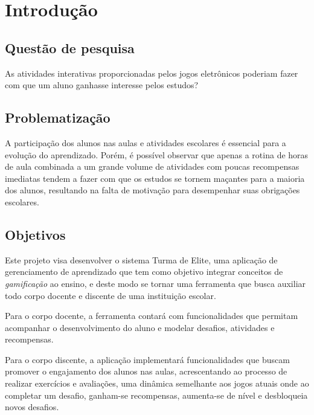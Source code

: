 \documentclass[
    12pt,               %
    openright,          %
    oneside,
    a4paper,            %
    paginasA3,  %
    MODELO,             %
    TODO,               %
    english,            %
    brazil              %
    ]{ifsp-spo-inf-ctds} %
\begin{document}
\tableofcontents*


\textual

\chapter[Introdução]{Introdução}
\section{Questão de pesquisa}
As atividades interativas proporcionadas pelos jogos eletrônicos poderiam fazer com que um aluno ganhasse interesse pelos estudos?

\section{Problematização}
A participação dos alunos nas aulas e atividades escolares é essencial para a evolução do aprendizado. Porém, é possível observar que apenas a rotina de horas de aula combinada a um grande volume de atividades com poucas recompensas imediatas tendem a fazer com que os estudos se tornem maçantes para a maioria dos alunos, resultando na falta de motivação para desempenhar suas obrigações escolares.

\section{Objetivos}
Este projeto visa desenvolver o sistema Turma de Elite, uma aplicação de gerenciamento de aprendizado que tem como objetivo integrar conceitos de \textit{gamificação} ao ensino, e deste modo se tornar uma ferramenta que busca auxiliar todo corpo docente e discente de uma instituição escolar.

Para o corpo docente, a ferramenta contará com funcionalidades que permitam acompanhar o desenvolvimento do aluno e modelar desafios, atividades e recompensas.

Para o corpo discente, a aplicação implementará funcionalidades que buscam promover o engajamento dos alunos nas aulas, acrescentando ao processo de realizar exercícios e avaliações, uma dinâmica semelhante aos jogos atuais onde ao completar um desafio, ganham-se recompensas, aumenta-se de nível e desbloqueia novos desafios.
\end{document}
